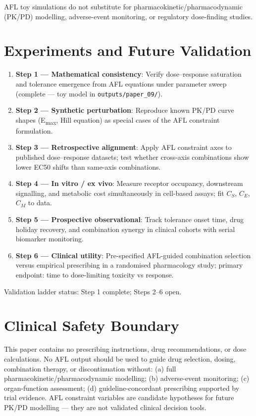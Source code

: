 \documentclass[11pt]{article}
\begin{document}
AFL toy simulations do not substitute for pharmacokinetic/pharmacodynamic (PK/PD) modelling, adverse-event monitoring, or regulatory dose-finding studies.

\section{Experiments and Future Validation}

\begin{enumerate}
  \item \textbf{Step 1 — Mathematical consistency}: Verify dose--response saturation and tolerance emergence from AFL equations under parameter sweep (complete — toy model in \texttt{outputs/paper\_09/}).
  \item \textbf{Step 2 — Synthetic perturbation}: Reproduce known PK/PD curve shapes (E\textsubscript{max}, Hill equation) as special cases of the AFL constraint formulation.
  \item \textbf{Step 3 — Retrospective alignment}: Apply AFL constraint axes to published dose--response datasets; test whether cross-axis combinations show lower EC50 shifts than same-axis combinations.
  \item \textbf{Step 4 — In vitro / ex vivo}: Measure receptor occupancy, downstream signalling, and metabolic cost simultaneously in cell-based assays; fit $C_S$, $C_E$, $C_M$ to data.
  \item \textbf{Step 5 — Prospective observational}: Track tolerance onset time, drug holiday recovery, and combination synergy in clinical cohorts with serial biomarker monitoring.
  \item \textbf{Step 6 — Clinical utility}: Pre-specified AFL-guided combination selection versus empirical prescribing in a randomised pharmacology study; primary endpoint: time to dose-limiting toxicity vs response.
\end{enumerate}

Validation ladder status: Step 1 complete; Steps 2--6 open.

\section{Clinical Safety Boundary}

This paper contains no prescribing instructions, drug recommendations, or dose calculations. No AFL output should be used to guide drug selection, dosing, combination therapy, or discontinuation without: (a) full pharmacokinetic/pharmacodynamic modelling; (b) adverse-event monitoring; (c) organ-function assessment; (d) guideline-concordant prescribing supported by trial evidence. AFL constraint variables are candidate hypotheses for future PK/PD modelling — they are not validated clinical decision tools.
\end{document}
